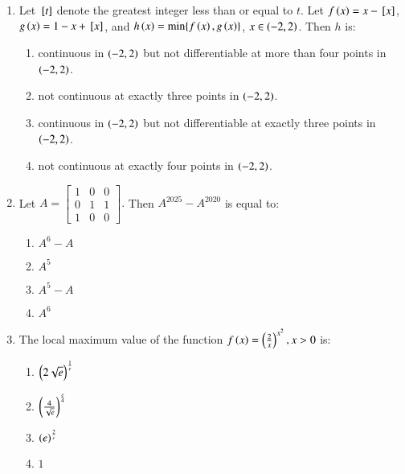 \documentclass[journal,9pt,onecolumn]{IEEEtran}
\begin{document}
\begin{enumerate}
\item Let ${}\left[t\right]$ denote the greatest integer less than or equal to $t$. Let $f\left(x\right) = x - {}\left[x\right]$, $g\left(x\right) = 1 - x + {}\left[x\right]$, and $h\left(x\right) = \min\{f\left(x\right), g\left(x\right)\}$, $x \in \left(-2, 2\right)$. Then $h$ is:

\begin{enumerate}
    \item continuous in $\left(-2, 2\right)$ but not differentiable at more than four points in $\left(-2, 2\right)$.
    \item not continuous at exactly three points in $\left(-2, 2\right)$.
    \item continuous in $\left(-2, 2\right)$ but not differentiable at exactly three points in $\left(-2, 2\right)$.
    \item not continuous at exactly four points in $\left(-2, 2\right)$.
\end{enumerate}


\item Let $A = \begin{bmatrix} 1 & 0 & 0 \\ 0 & 1 & 1 \\ 1 & 0 & 0 \end{bmatrix}. $
Then $ A^{2025} - A^{2020} $ is equal to:
\begin{multicols}{4}    
\begin{enumerate}
    \item $ A^6 - A $
    \item $ A^5 $
    \item $ A^5 - A $
    \item $ A^6 $
\end{enumerate}
\end{multicols}


\item The local maximum value of the function $f\left(x\right) = \left(\frac{2}{x}\right)^{x^2}, x > 0$
is:
\begin{multicols}{4}
    \begin{enumerate}
    \item $ \left(2\sqrt{e}\right)^{\frac{1}{e}} $
    \item $ \left(\frac{4}{\sqrt{e}}\right)^{\frac{e}{4}} $
    \item $ \left(e\right)^{\frac{2}{e}} $
    \item $ 1 $
\end{enumerate}
\end{multicols}



\end{enumerate}
\end{document}
